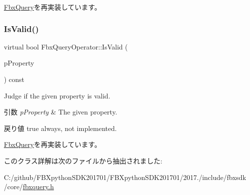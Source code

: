 \hyperlink{class_fbx_query_adfc24c7306ceed2fcfd8c67198e0c1dd}{Fbx\+Query}を再実装しています。

\mbox{\label{class_fbx_query_operator_a14dd8a653d1e802f43b60c13d137ccce}} 
\subsubsection{\texorpdfstring{Is\+Valid()}{IsValid()}}
{\footnotesize\ttfamily virtual bool Fbx\+Query\+Operator\+::\+Is\+Valid (\begin{DoxyParamCaption}\item[{const \hyperlink{class_fbx_property}{Fbx\+Property} \&}]{p\+Property }\end{DoxyParamCaption}) const\hspace{0.3cm}{\ttfamily [virtual]}}

Judge if the given property is valid. 
\begin{DoxyParams}{引数}
{\em p\+Property} & The given property. \\
\hline
\end{DoxyParams}
\begin{DoxyReturn}{戻り値}
{\ttfamily true} always, not implemented. 
\end{DoxyReturn}


\hyperlink{class_fbx_query_a822776baf45a56d8e126e948ec25d920}{Fbx\+Query}を再実装しています。



このクラス詳解は次のファイルから抽出されました\+:\begin{DoxyCompactItemize}
\item 
C\+:/github/\+F\+B\+Xpython\+S\+D\+K201701/\+F\+B\+Xpython\+S\+D\+K201701/2017./include/fbxsdk/core/\hyperlink{fbxquery_8h}{fbxquery.\+h}\end{DoxyCompactItemize}

